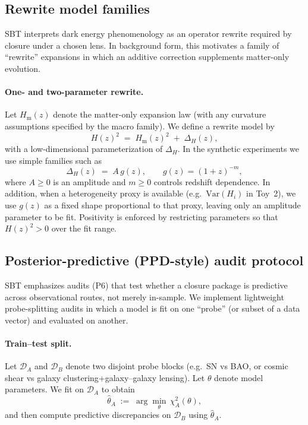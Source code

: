 \documentclass[11pt]{article}
\theoremstyle{definition}
\theoremstyle{plain}
\theoremstyle{remark}
\begin{document}
\subsection{Rewrite model families}\label{sec:methods:rewrite}
SBT interprets dark energy phenomenology as an operator rewrite required by closure under a chosen lens.
In background form, this motivates a family of ``rewrite'' expansions in which an additive correction supplements matter-only evolution.

\paragraph{One- and two-parameter rewrite.}
Let $H_{\mathrm{m}}(z)$ denote the matter-only expansion law (with any curvature assumptions specified by the macro family).
We define a rewrite model by
\begin{equation}
H(z)^2 \;=\; H_{\mathrm{m}}(z)^2 \;+\; \Delta_H(z),
\label{eq:rewrite_general}
\end{equation}
with a low-dimensional parameterization of $\Delta_H$.
In the synthetic experiments we use simple families such as
\begin{equation}
\Delta_H(z) \;=\; A\,g(z),\qquad g(z)=(1+z)^{-m},
\label{eq:rewrite_powerlaw}
\end{equation}
where $A\ge 0$ is an amplitude and $m\ge 0$ controls redshift dependence.
In addition, when a heterogeneity proxy is available (e.g.\ $\mathrm{Var}(H_i)$ in Toy~2), we use $g(z)$ as a fixed shape proportional to that proxy, leaving only an amplitude parameter to be fit. Positivity is enforced by restricting parameters so that $H(z)^2>0$ over the fit range.

\subsection{Posterior-predictive (PPD-style) audit protocol}\label{sec:methods:ppd}
SBT emphasizes audits (P6) that test whether a closure package is predictive across observational routes, not merely in-sample.
We implement lightweight probe-splitting audits in which a model is fit on one ``probe'' (or subset of a data vector) and evaluated on another.

\paragraph{Train--test split.}
Let $\mathcal{D}_A$ and $\mathcal{D}_B$ denote two disjoint probe blocks (e.g.\ SN vs BAO, or cosmic shear vs galaxy clustering+galaxy--galaxy lensing).
Let $\theta$ denote model parameters. We fit on $\mathcal{D}_A$ to obtain
\begin{equation}
\hat\theta_A \;:=\; \arg\min_{\theta}\,\chi^2_A(\theta),
\label{eq:theta_hat_train}
\end{equation}
and then compute predictive discrepancies on $\mathcal{D}_B$ using $\hat\theta_A$.
\end{document}
